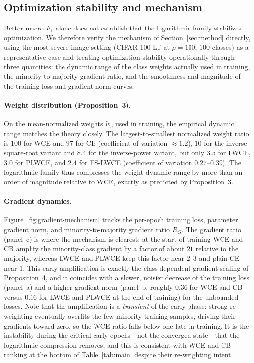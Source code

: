 \documentclass[a4paper,fleqn]{cas-sc}
\begin{document}
\subsection{Optimization stability and mechanism}\label{sec:stability}
Better macro-$F_1$ alone does not establish that the logarithmic family stabilizes
optimization. We therefore verify the mechanism of
Section~\ref{sec:method} directly, using the most severe image setting
(CIFAR-100-LT at $\rho=100$, $100$ classes) as a representative case and treating
optimization stability operationally through three quantities: the dynamic range of
the class weights actually used in training, the minority-to-majority gradient
ratio, and the smoothness and magnitude of the training-loss and gradient-norm
curves.

\paragraph{Weight distribution (Proposition~3).}
On the mean-normalized weights $\widetilde{w}_c$ used in training, the empirical
dynamic range matches the theory closely. The largest-to-smallest normalized weight
ratio is $100$ for WCE and $97$ for CB (coefficient of variation $\approx 1.2$),
$10$ for the inverse-square-root variant and $8.4$ for the inverse-power variant,
but only $3.5$ for LWCE, $3.0$ for PLWCE, and $2.4$ for ES-LWCE (coefficient of
variation $0.27$--$0.39$). The logarithmic family thus compresses the weight
dynamic range by more than an order of magnitude relative to WCE, exactly as
predicted by Proposition~3.

\paragraph{Gradient dynamics.}
Figure~\ref{fig:gradient-mechanism} tracks the per-epoch training loss, parameter
gradient norm, and minority-to-majority gradient ratio $R_G$. The gradient ratio
(panel~c) is where the mechanism is clearest: at the start of training WCE and CB
amplify the minority-class gradient by a factor of about $21$ relative to the
majority, whereas LWCE and PLWCE keep this factor near $2$--$3$ and plain CE near
$1$. This early amplification is exactly the class-dependent gradient scaling of
Proposition~4, and it coincides with a slower, noisier decrease of the training
loss (panel~a) and a higher gradient norm (panel~b, roughly $0.36$ for WCE and CB
versus $0.16$ for LWCE and PLWCE at the end of training) for the unbounded losses.
Note that the amplification is a \emph{transient} of the early phase: strong
re-weighting eventually overfits the few minority training samples, driving their
gradients toward zero, so the WCE ratio falls below one late in training. It is the
instability during the critical early epochs---not the converged state---that the
logarithmic compression removes, and this is consistent with WCE and CB ranking at
the bottom of Table~\ref{tab:main} despite their re-weighting intent.
\end{document}
